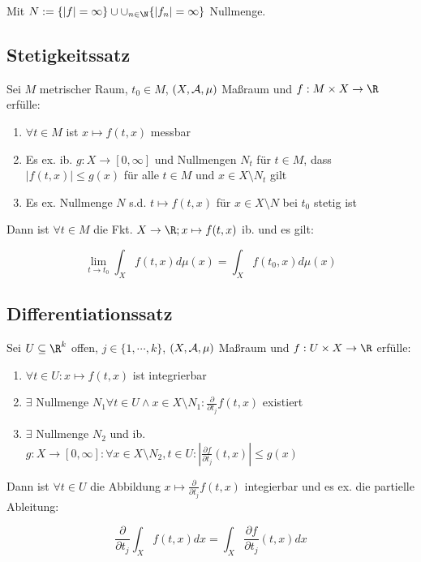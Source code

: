 Mit $N := \{|f| = \infty\} \cup \cup_{n \in \N} \{|f_n| = \infty\}$ Nullmenge.

\subsection*{Stetigkeitssatz}

Sei $M$ metrischer Raum, $t_0 \in M$, $(X,\mathcal{A},\mu)$ Maßraum und $f : M \times X \to \R$ erfülle:

\begin{enumerate}[label=(\alph*)]
	\item $\forall t \in M$ ist $x \mapsto f(t,x)$ messbar
	\item Es ex. ib. $g : X \to [0,\infty]$ und Nullmengen $N_t$ für $t \in M$, dass $|f(t,x)| \leq g(x)$ für alle $t \in M$ und $x \in X \setminus N_t$ gilt
	\item Es ex. Nullmenge $N$ s.d. $t \mapsto f(t,x)$ für $x \in X \setminus N$ bei $t_0$ stetig ist
\end{enumerate}

Dann ist $\forall t \in M$ die Fkt. $X \to \R; x \mapsto f(t,x)$ ib. und es gilt:

\vspace{-2mm}
$$\lim_{t \to t_0} \int_X f(t,x) d\mu(x) = \int_X f(t_0,x) d\mu(x)$$

\subsection*{Differentiationssatz}

Sei $U \subseteq \R^k$ offen, $j \in \{1,\cdots,k\}$, $(X,\mathcal{A},\mu)$ Maßraum und $f : U \times X \to \R$ erfülle:

\begin{enumerate}[label=(\alph*)]
	\item $\forall t \in U : x \mapsto f(t,x)$ ist integrierbar
	\item $\exists$ Nullmenge $N_1 \forall t \in U \land x \in X \setminus N_1 : \frac{\partial}{\partial t_j} f(t,x)$ existiert
	\item $\exists$ Nullmenge $N_2$ und ib. $g : X \to [0,\infty] : \forall x \in X \setminus N_2, t \in U : |\frac{\partial f}{\partial t_j} (t,x)| \leq g(x)$
\end{enumerate}

Dann ist $\forall t \in U$ die Abbildung $x \mapsto \frac{\partial}{\partial t_j} f(t,x)$ integierbar und es ex. die partielle Ableitung:

$$\frac{\partial}{\partial t_j} \int_X f(t,x) dx = \int_X \frac{\partial f}{\partial t_j} (t,x) dx$$

